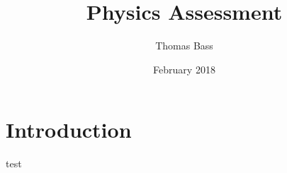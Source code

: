 \documentclass{article}
\title{Physics Assessment}
\author{Thomas Bass}
\date{February 2018}
\begin{document}
\maketitle

\section{Introduction}

test
\end{document}
